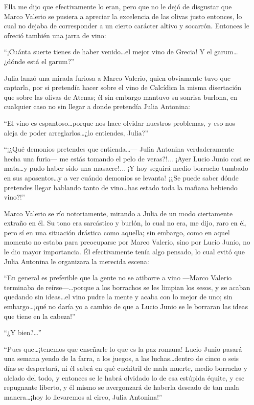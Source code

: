 \documentclass[11pt,openany]{book}
\begin{document}
Ella me dijo que efectivamente lo eran, pero que no le dejó de disgustar que Marco Valerio se pusiera a apreciar la excelencia de las olivas justo entonces, lo cual no dejaba de corresponder a un cierto carácter altivo y socarrón. Entonces le ofreció también una jarra de vino: 

“¡Cuánta suerte tienes de haber venido\dots el mejor vino de Grecia! Y el garum\dots ¿dónde está el garum?” 

Julia lanzó una mirada furiosa a Marco Valerio, quien obviamente tuvo que captarla, por si pretendía hacer sobre el vino de Calcídica la misma disertación que sobre las olivas de Atenas; él sin embargo mantuvo su sonrisa burlona, en cualquier caso no sin llegar a donde pretendía Julia Antonina: 

“El vino es espantoso\dots porque nos hace olvidar nuestros problemas, y eso nos aleja de poder arreglarlos\dots ¿lo entiendes, Julia?” 

“¡¿Qué demonios pretendes que entienda\dots— Julia Antonina verdaderamente hecha una furia— me estás tomando el pelo de veras?!... ¡Ayer Lucio Junio casi se mata\dots y pudo haber sido una masacre!... ¡Y hoy seguirá medio borracho tumbado en sus aposentos\dots y a ver cuándo demonios se levanta! ¡¿Se puede saber dónde pretendes llegar hablando tanto de vino\dots has estado toda la mañana bebiendo vino?!” 

Marco Valerio se río notoriamente, mirando a Julia de un modo ciertamente extraño en él. Su tono era sarcástico y burlón, lo cual no era, me dijo, raro en él, pero sí en una situación drástica como aquella; sin embargo, como en aquel momento no estaba para preocuparse por Marco Valerio, sino por Lucio Junio, no le dio mayor importancia. Él efectivamente tenía algo pensado, lo cual evitó que Julia Antonina le organizara la merecida escena: 

“En general es preferible que la gente no se atiborre a vino —Marco Valerio terminaba de reírse—\dots porque a los borrachos se les limpian los sesos, y se acaban quedando sin ideas\dots el vino pudre la mente y acaba con lo mejor de uno; sin embargo\dots ¡qué no daría yo a cambio de que a Lucio Junio se le borraran las ideas que tiene en la cabeza!” 

“¿Y bien?\dots” 

“Pues que\dots ¡tenemos que enseñarle lo que es la paz romana! Lucio Junio pasará una semana yendo de la farra, a los juegos, a las luchas\dots dentro de cinco o seis días se despertará, ni él sabrá en qué cuchitril de mala muerte, medio borracho y alelado del todo, y entonces se le habrá olvidado lo de esa estúpida équite, y ese repugnante liberto, y él mismo se avergonzará de haberla deseado de tan mala manera\dots ¡hoy lo llevaremos al circo, Julia Antonina!” 
\end{document}
